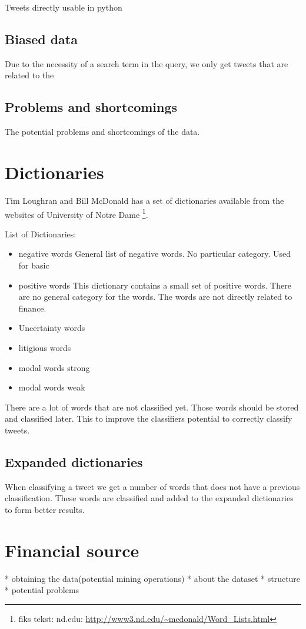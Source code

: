 Tweets directly usable in python 

\subsection{Biased data}
Due to the necessity of a search term in the query, we only get tweets that are
related to the 

\subsection{Problems and shortcomings}
The potential problems and shortcomings of the data. 

\section{Dictionaries}\label{sec:dict}

Tim Loughran and Bill McDonald has a set of dictionaries available from the
websites of University of Notre Dame \footnote{fiks tekst: nd.edu:
\url{http://www3.nd.edu/~mcdonald/Word_Lists.html}}. 

List of Dictionaries:
\begin{itemize}
    \item negative words
General list of negative words. No particular category. Used for basic   
    \item positive words
This dictionary contains a small set of positive words. There are no general
category for the words. The words are not directly related to finance. 
    \item Uncertainty words
    \item litigious words
    \item modal words strong
    \item modal words weak
\end{itemize}

There are a lot of words that are not classified yet. Those words should be
stored and classified later. This to improve the classifiers potential to
correctly classify tweets.  

\subsection{Expanded dictionaries}
When classifying a tweet we get a number of words that does not have a previous
classification. These words are classified and added to the expanded
dictionaries to form better results. 


\section{Financial source}
* obtaining the data(potential mining operations)
* about the dataset  
* structure
* potential problems 
